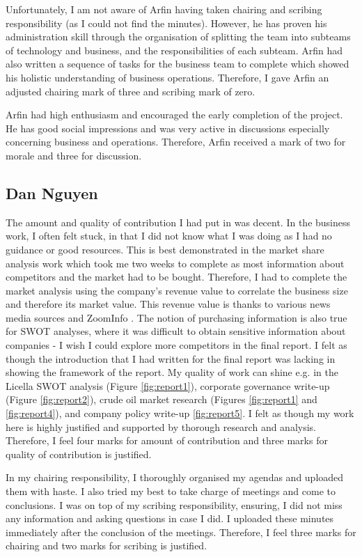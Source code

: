 \documentclass[11pt, a4, nocenter, margin=150mm]{article}
\begin{document}
	Unfortunately, I am not aware of Arfin having taken chairing and scribing responsibility (as I could not find the minutes). However, he has proven his administration skill through the organisation of splitting the team into subteams of technology and business, and the responsibilities of each subteam. Arfin had also written a sequence of tasks for the business team to complete which showed his holistic understanding of business operations. Therefore, I gave Arfin an adjusted chairing mark of three and scribing mark of zero.

	Arfin had high enthusiasm and encouraged the early completion of the project. He has good social impressions and was very active in discussions especially concerning business and operations. Therefore, Arfin received a mark of two for morale and three for discussion.

	\subsection{Dan Nguyen}

	The amount and quality of contribution I had put in was decent. In the business work, I often felt stuck, in that I did not know what I was doing as I had no guidance or good resources. This is best demonstrated in the market share analysis work which took me two weeks to complete as most information about competitors and the market had to be bought. Therefore, I had to complete the market analysis using the company's revenue value to correlate the business size and therefore its market value. This revenue value is thanks to various news media sources and ZoomInfo \cite{zoom}. The notion of purchasing information is also true for SWOT analyses, where it was difficult to obtain sensitive information about companies - I wish I could explore more competitors in the final report. I felt as though the introduction that I had written for the final report was lacking in showing the framework of the report. My quality of work can shine e.g. in the Licella SWOT analysis (Figure \ref{fig:report1}), corporate governance write-up (Figure \ref{fig:report2}), crude oil market research (Figures \ref{fig:report1} and \ref{fig:report4}), and company policy write-up \ref{fig:report5}. I felt as though my work here is highly justified and supported by thorough research and analysis. Therefore, I feel four marks for amount of contribution and three marks for quality of contribution is justified.

	In my chairing responsibility, I thoroughly organised my agendas and uploaded them with haste. I also tried my best to take charge of meetings and come to conclusions. I was on top of my scribing responsibility, ensuring, I did not miss any information and asking questions in case I did. I uploaded these minutes immediately after the conclusion of the meetings. Therefore, I feel three marks for chairing and two marks for scribing is justified.
\end{document}
